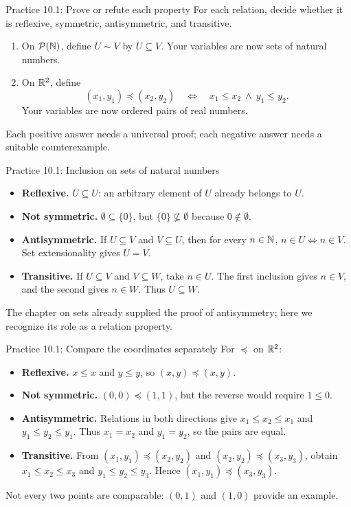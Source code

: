 \begin{frame}{Practice 10.1: Prove or refute each property}
For each relation, decide whether it is reflexive, symmetric, antisymmetric, and transitive.
\begin{enumerate}
\item On $\mathcal P(\mathbb{N})$, define $U\sim V$ by $U\subseteq V$.
Your variables are now sets of natural numbers.
\item On $\mathbb{R}^2$, define
\[
 (x_1,y_1)\preceq(x_2,y_2)
 \quad\Longleftrightarrow\quad
 x_1\le x_2\ \land\ y_1\le y_2.
\]
Your variables are now ordered pairs of real numbers.
\end{enumerate}
Each positive answer needs a universal proof; each negative answer needs a suitable counterexample.
\end{frame}

\begin{frame}{Practice 10.1: Inclusion on sets of natural numbers}
\begin{itemize}
\item \textbf{Reflexive.} $U\subseteq U$: an arbitrary element of $U$ already belongs to $U$.
\item \textbf{Not symmetric.} $\emptyset\subseteq\{0\}$, but $\{0\}\not\subseteq\emptyset$
because $0\notin\emptyset$.
\item \textbf{Antisymmetric.} If $U\subseteq V$ and $V\subseteq U$, then for every $n\in\mathbb{N}$,
$n\in U\iff n\in V$. Set extensionality gives $U=V$.
\item \textbf{Transitive.} If $U\subseteq V$ and $V\subseteq W$, take $n\in U$.
The first inclusion gives $n\in V$, and the second gives $n\in W$.
Thus $U\subseteq W$.
\end{itemize}
The chapter on sets already supplied the proof of antisymmetry; here we recognize its role as a relation property.
\end{frame}

\begin{frame}{Practice 10.1: Compare the coordinates separately}
For $\preceq$ on $\mathbb{R}^2$:
\begin{itemize}
\item \textbf{Reflexive.} $x\le x$ and $y\le y$, so $(x,y)\preceq(x,y)$.
\item \textbf{Not symmetric.} $(0,0)\preceq(1,1)$, but the reverse would require $1\le0$.
\item \textbf{Antisymmetric.} Relations in both directions give
$x_1\le x_2\le x_1$ and $y_1\le y_2\le y_1$.
Thus $x_1=x_2$ and $y_1=y_2$, so the pairs are equal.
\item \textbf{Transitive.} From $(x_1,y_1)\preceq(x_2,y_2)$ and
$(x_2,y_2)\preceq(x_3,y_3)$, obtain
$x_1\le x_2\le x_3$ and $y_1\le y_2\le y_3$.
Hence $(x_1,y_1)\preceq(x_3,y_3)$.
\end{itemize}
Not every two points are comparable: $(0,1)$ and $(1,0)$ provide an example.
\end{frame}

